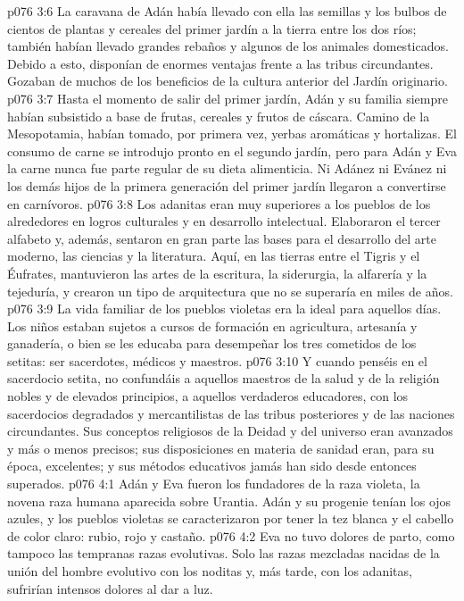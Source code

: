 \vs p076 3:6 \pc La caravana de Adán había llevado con ella las semillas y los bulbos de cientos de plantas y cereales del primer jardín a la tierra entre los dos ríos; también habían llevado grandes rebaños y algunos de los animales domesticados. Debido a esto, disponían de enormes ventajas frente a las tribus circundantes. Gozaban de muchos de los beneficios de la cultura anterior del Jardín originario.
\vs p076 3:7 Hasta el momento de salir del primer jardín, Adán y su familia siempre habían subsistido a base de frutas, cereales y frutos de cáscara. Camino de la Mesopotamia, habían tomado, por primera vez, yerbas aromáticas y hortalizas. El consumo de carne se introdujo pronto en el segundo jardín, pero para Adán y Eva la carne nunca fue parte regular de su dieta alimenticia. Ni Adánez ni Evánez ni los demás hijos de la primera generación del primer jardín llegaron a convertirse en carnívoros.
\vs p076 3:8 \pc Los adanitas eran muy superiores a los pueblos de los alrededores en logros culturales y en desarrollo intelectual. Elaboraron el tercer alfabeto y, además, sentaron en gran parte las bases para el desarrollo del arte moderno, las ciencias y la literatura. Aquí, en las tierras entre el Tigris y el Éufrates, mantuvieron las artes de la escritura, la siderurgia, la alfarería y la tejeduría, y crearon un tipo de arquitectura que no se superaría en miles de años.
\vs p076 3:9 La vida familiar de los pueblos violetas era la ideal para aquellos días. Los niños estaban sujetos a cursos de formación en agricultura, artesanía y ganadería, o bien se les educaba para desempeñar los tres cometidos de los setitas: ser sacerdotes, médicos y maestros.
\vs p076 3:10 Y cuando penséis en el sacerdocio setita, no confundáis a aquellos maestros de la salud y de la religión nobles y de elevados principios, a aquellos verdaderos educadores, con los sacerdocios degradados y mercantilistas de las tribus posteriores y de las naciones circundantes. Sus conceptos religiosos de la Deidad y del universo eran avanzados y más o menos precisos; sus disposiciones en materia de sanidad eran, para su época, excelentes; y sus métodos educativos jamás han sido desde entonces superados.
\vs p076 4:1 Adán y Eva fueron los fundadores de la raza violeta, la novena raza humana aparecida sobre Urantia. Adán y su progenie tenían los ojos azules, y los pueblos violetas se caracterizaron por tener la tez blanca y el cabello de color claro: rubio, rojo y castaño.
\vs p076 4:2 Eva no tuvo dolores de parto, como tampoco las tempranas razas evolutivas. Solo las razas mezcladas nacidas de la unión del hombre evolutivo con los noditas y, más tarde, con los adanitas, sufrirían intensos dolores al dar a luz.
